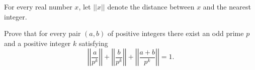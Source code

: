 For every real number $x$,  let $||x||$ denote the distance between $x$ and the nearest integer.

Prove that for every pair $(a, b)$ of positive integers there exist an odd prime $p$ and a positive integer $k$ satisfying 
\[\displaystyle\left|\left|\frac{a}{p^k}\right|\right|+\left|\left|\frac{b}{p^k}\right|\right|+\left|\left|\frac{a+b}{p^k}\right|\right|=1.\]
